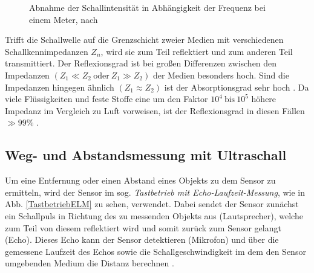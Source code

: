 \begin{figure}[h]
    \begin{center}

        \caption{Abnahme der Schallintensität in Abhängigkeit der Frequenz bei einem Meter, nach \cite{Hering:2023}}
        \label{DiagrammIntensitaet}
    \end{center}
\end{figure}

Trifft die Schallwelle auf die Grenzschicht zweier Medien mit verschiedenen Schallkennimpedanzen $Z_n$, wird sie zum Teil reflektiert und zum anderen Teil transmittiert. Der Reflexionsgrad ist bei großen Differenzen zwischen den Impedanzen $\left(Z_1 \ll Z_2 \:\text{oder} \:Z_1 \gg Z_2\right)$ der Medien besonders hoch. Sind die Impedanzen hingegen ähnlich $\left(Z_1 \approx Z_2\right)$ ist der Absorptionsgrad sehr hoch \cite{Hering:2021b}. 
Da viele Flüssigkeiten und feste Stoffe eine um den Faktor $10^4 \:\text{bis} \:10^5$ höhere Impedanz im Vergleich zu Luft vorweisen, ist der Reflexionsgrad in diesen Fällen $\gg 99\%$ \cite{Hering:2021b,Hering:2023}.

\subsection{Weg- und Abstandsmessung mit Ultraschall}

Um eine Entfernung oder einen Abstand eines Objekts zu dem Sensor zu ermitteln, wird der Sensor im sog. \textit{Tastbetrieb mit Echo-Laufzeit-Messung}, wie in Abb. \ref{TastbetriebELM} zu sehen, verwendet. Dabei sendet der Sensor zunächst ein Schallpuls in Richtung des zu messenden Objekts aus (Lautsprecher), welche zum Teil von diesem reflektiert wird und somit zurück zum Sensor gelangt (Echo). Dieses Echo kann der Sensor detektieren (Mikrofon) und über die gemessene Laufzeit des Echos sowie die Schallgeschwindigkeit im dem den Sensor umgebenden Medium die Distanz berechnen \cite{Hering:2023}.

